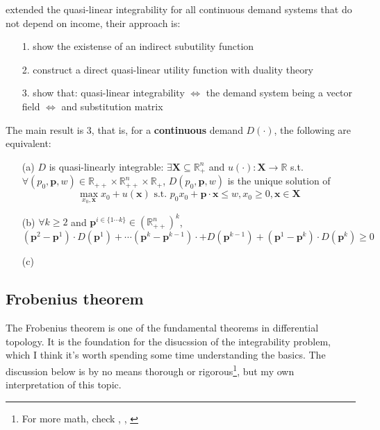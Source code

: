 \citet*{nocke2017quasi} extended the quasi-linear integrability for all continuous demand systems that do not depend on income, their approach is:
\begin{enumerate}
    \item[1.] show the existense of an indirect subutility function
    \item[2.] construct a direct quasi-linear utility function with duality theory
    \item[3.] show that: quasi-linear integrability $\Leftrightarrow$ the demand system being a  vector field $\Leftrightarrow$   and  substitution matrix
\end{enumerate}

The main result is 3, that is, for a \textbf{continuous} demand $D(\cdot)$, the following are equivalent:
\begin{enumerate}
    \item[(a)] $D$ is quasi-linearly integrable: $\exists \mathbf{X}\subseteq \mathbb{R}^n_+$ and $u(\cdot):\mathbf{X}\rightarrow \mathbb{R}$ s.t. $\forall (p_0,\mathbf{p},w)\in\mathbb{R}_{++}\times \mathbb{R}^n_{++}\times \mathbb{R}_+$, $D(p_0,\mathbf{p},w)$ is the unique solution of 
    $$\max_{x_0,\mathbf{x}}x_0+u(\mathbf{x}) \text{ s.t. } p_0x_0+\mathbf{p}\cdot\mathbf{x}\leq w, x_0\geq 0,\mathbf{x}\in \mathbf{X}
    $$
    \item[(b)] $\forall k\geq 2$ and $\mathbf{p}^{i\in \{1\cdots k\}}\in \left(\mathbb{R}^n_{++}\right)^k$, $$ \left(\mathbf{p}^2-\mathbf{p}^1\right)\cdot D\left(\mathbf{p}^1\right) +\cdots \left(\mathbf{p}^k-\mathbf{p}^{k-1}\right)\cdot + D\left(\mathbf{p}^{k-1}\right) + \left(\mathbf{p}^1-\mathbf{p}^k\right)\cdot D\left(\mathbf{p}^k\right)\geq 0 $$
    \item[(c)]
\end{enumerate}

\subsection{Frobenius theorem}\label{sssec:frobenius_theorem}
The Frobenius theorem is one of the fundamental theorems in differential topology. It is the foundation for the disucssion of the integrability problem, which I think it's worth spending some time understanding the basics. The discussion below is by no means thorough or rigorous\footnote{For more math, check \cite{sternberg1999lectures}, \cite{warner1983foundations}, \cite{mccleary2013geometry}}, but my own interpretation of this topic.


